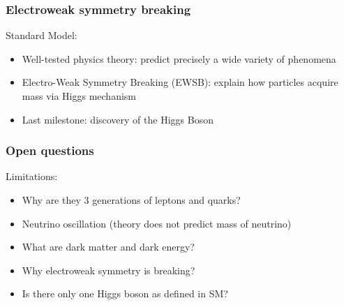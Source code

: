 \documentclass{beamer}
\begin{document}

   \begin{frame}
     \frametitle{Electroweak symmetry breaking}

     \begin{block}{Standard Model:}
        \begin{itemize}
          \item Well-tested physics theory: predict precisely a wide variety of phenomena
          \item Electro-Weak Symmetry Breaking (EWSB): explain how particles acquire mass via Higgs mechanism
          \item Last milestone: discovery of the Higgs Boson
        \end{itemize}
     \end{block}

   \end{frame} 
    
    \begin{frame}
      \frametitle{Open questions}


      \begin{alertblock}{Limitations:}
        \begin{itemize}
          \item Why are they 3 generations of leptons and quarks?
          \item Neutrino oscillation (theory does not predict mass of neutrino)
          \item What are dark matter and dark energy?
          \item Why electroweak symmetry is breaking?
          \item Is there only one Higgs boson as defined in SM?
        \end{itemize}
      \end{alertblock}
      
    \end{frame}
    
\end{document}
